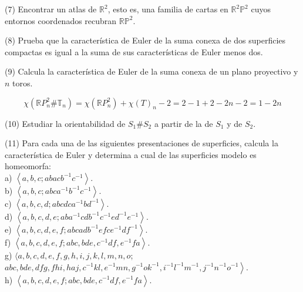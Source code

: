 \documentclass[
  a4paper,
  spanish,
  12pt,
]{scrartcl}
\begin{document}
\begin{ejer}
(7) Encontrar un atlas de $\mathbb{R}^{2}$, esto es, una familia de cartas en $\mathbb{R}^{2} \mathbb{P}^{2}$ cuyos entornos coordenados recubran $\mathbb{R} \mathbb{P}^{2}$.\\
\end{ejer}

\begin{ejer}
(8) Prueba que la característica de Euler de la suma conexa de dos superficies compactas es igual a la suma de sus características de Euler menos dos.\\
\end{ejer}

\begin{ejer}
(9) Calcula la característica de Euler de la suma conexa de un plano proyectivo y $n$ toros.\\
\end{ejer}

\begin{sol}
$$
\chi(\mathbb{R}P^2_n \# \mathbb{T}_n) = \chi(\mathbb{R}P^2_n) + \chi(T)_n - 2 = 2 - 1 + 2 - 2n - 2 = 1 -2n
$$
\end{sol}

\begin{ejer}
(10) Estudiar la orientabilidad de $S_{1} \# S_{2}$ a partir de la de $S_{1}$ y de $S_{2}$.\\
\end{ejer}

\begin{ejer}
(11) Para cada una de las siguientes presentaciones de superficies, calcula la característica de Euler y determina a cual de las superficies modelo es homeomorfa:\\
a) $\left\langle a, b, c ; a b a c b^{-1} c^{-1}\right\rangle$.\\
b) $\left\langle a, b, c ; a b c a^{-1} b^{-1} c^{-1}\right\rangle$.\\
c) $\left\langle a, b, c, d ; a b c d c a^{-1} b d^{-1}\right\rangle$.\\
d) $\left\langle a, b, c, d, e ; a b a^{-1} c d b^{-1} c^{-1} e d^{-1} e^{-1}\right\rangle$.\\
e) $\left\langle a, b, c, d, e, f ; a b c a d b^{-1} e f c e^{-1} d f^{-1}\right\rangle$.\\
f) $\left\langle a, b, c, d, e, f ; a b c, b d e, c^{-1} d f, e^{-1} f a\right\rangle$.\\
g) $\langle a, b, c, d, e, f, g, h, i, j, k, l, m, n, o$;\\
$\left.a b c, b d e, d f g, f h i, h a j, c^{-1} k l, e^{-1} m n, g^{-1} o k^{-1}, i^{-1} l^{-1} m^{-1}, j^{-1} n^{-1} o^{-1}\right\rangle$.\\
h) $\left\langle a, b, c, d, e, f ; a b c, b d e, c^{-1} d f, e^{-1} f a\right\rangle$.\\
\end{ejer}
\end{document}
